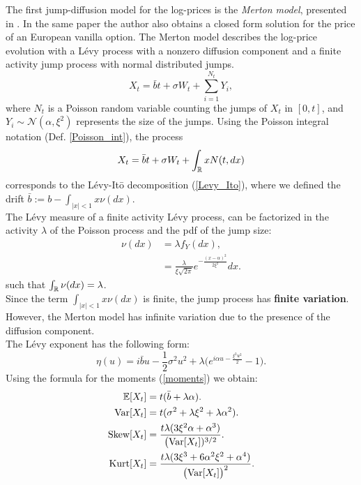 The first jump-diffusion model for the log-prices is the \emph{Merton model}, presented in 
\cite{Me76}. In the same paper the author also obtains a closed form solution for the price of an European vanilla option. 
The Merton model describes the log-price evolution with a Lévy process with a nonzero diffusion 
component and a finite activity jump process with normal distributed jumps.
\begin{equation}\label{MertonM}
X_t = \bar b t + \sigma W_t + \sum_{i=1}^{N_t} Y_i, 
\end{equation}
where $N_t$ is a Poisson random variable counting the jumps of $X_t$ in $[0,t]$, and $Y_i \sim \mathcal{N}(\alpha, \xi^2)$ represents the size of the jumps.
Using the Poisson integral notation (Def. \ref{Poisson_int}), the process
\begin{equation*}
 X_t = \bar b t + \sigma W_t + \int_{\mathbb{R}} x N(t,dx)
\end{equation*}
corresponds to the Lévy-It\={o} decomposition (\ref{Levy_Ito}),  
where we defined the drift
$\bar b := b - \int_{|x|<1} x \nu(dx)$.\\
The Lévy measure of a finite activity Lévy process, can be factorized in the activity $\lambda$ of the Poisson process and 
the pdf of the jump size:
\begin{align*}
 \nu(dx) &= \lambda f_Y(dx), \\
	 &= \frac{\lambda}{\xi \sqrt{2\pi}} e^{- \frac{(x-\alpha)^2}{2\xi^2}} dx.  
\end{align*}
such that $\int_{\mathbb{R}} \nu(dx) = \lambda$.\\
Since the term $\int_{|x|<1} x \nu(dx)$ is finite, the jump process has \textbf{finite variation}. However, 
the Merton model has infinite variation due to the presence of the diffusion component.\\ 
The Lévy exponent has the following form:
\begin{equation}
 \eta(u) = i\bar b u - \frac{1}{2} \sigma^2 u^2 + \lambda \biggl( e^{i\alpha u -\frac{\xi^2 u^2}{2} }-1 \biggr). 
\end{equation}
\newline
Using the formula for the moments (\ref{moments}) we obtain:
\begin{align}\label{Merton_moments}
 \mathbb{E}[X_t] &= t(\bar b+\lambda \alpha). \\ \nonumber
 \mbox{Var}[X_t] &= t(\sigma^2 + \lambda \xi^2 + \lambda \alpha^2). \\ \nonumber
 \mbox{Skew}[X_t] &= \frac{t\lambda (3\xi^2 \alpha + \alpha^3)}{\bigl(\mbox{Var}[X_t])^{3/2}}. \\ \nonumber
 \mbox{Kurt}[X_t] &= \frac{t \lambda (3\xi^3 +6\alpha^2\xi^2 +\alpha^4)}{\bigl(\mbox{Var}[X_t]\bigr)^2}. \nonumber
\end{align} \newline
